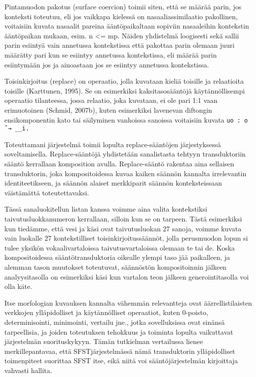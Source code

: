 \documentclass[free]{flammie}
\begin{document}
Pintamuodon pakotus (surface coercion) toimii siten, että se määrää parin, jos
konteksti toteutuu, eli jos vaikkapa kielessä on nasaaliassimilaatio pakollinen, voitaisiin kuvata nasaalit pareina ääntöpaikaltaan sopiviin nasaaleihin kontekstin ääntöpaikan mukaan, esim. n <= mp. Näiden yhdistelmä loogisesti sekä sallii parin
esiintyä vain annetussa kontekstissa että pakottaa parin olemaan juuri määrätty
pari kun se esiintyy annetussa kontekstissa, eli määrää parin esiintymään jos ja
ainoastaan jos se esiintyy annetussa kontekstissa.

Toisinkirjoitus (replace) on operaatio, jolla kuvataan kieliä toisille ja relaatioita
toisille (Karttunen, 1995). Se on esimerkiksi kaksitasosääntöjä käytännöllisempi
operaatio tilanteessa, jossa relaatio, joka kuvataan, ei ole pari 1:1 vaan erimuotoinen (Schmid, 2007b), kuten esimerkiksi lavenevan diftongin ensikomponentin
kato tai säilyminen vanhoissa sanoissa voitaisiin kuvata \verb|uo : o ˆ→ __i.|

Toteuttamani järjestelmä toimii lopulta replace-sääntöjen järjestyksessä soveltamisella. Replace-sääntöjä yhdistetään sanalistasta tehtyyn transduktoriin sääntö
kerrallaan komposition avulla. Replace-sääntö rakentaa aina sellaisen transduktorin, joka kompositoidessa kuvaa kaiken säännön kannalta irrelevantin identiteetikseen, ja säännön alaiset merkkiparit säännön konteksteissaan väistämättä toteutettavaksi.

Tässä sanaluokitellun listan kanssa voimme aina valita kontekstiksi taivutusluokkanumeron kerrallaan, silloin kun se on tarpeen. Tästä esimerkiksi kun tiedämme, että vesi ja käsi ovat taivutusluokan 27 sanoja, voimme kuvata vain luokalle
27 kontekstilliset toisinkirjoitussäännöt, jolla perusmuodon lopun si tulee yksikön vokaalivartaloissa taivutusvartaloissa olemaan te tai de. Koska kompositoidessa sääntötransduktoria oikealle ylempi taso jää paikalleen, ja alemman tason
muutokset toteutuvat, säännöstön kompositoinnin jälkeen analyysitasolla on esimerkiksi käsi kun vartalon teon jälkeen generointitasolla voi olla käte.

Itse morfologian kuvauksen kannalta vähemmän relevantteja ovat
äärrellistilaisten verkkojen ylläpidolliset ja käytännölliset operaatiot, kuten
0-poisto, determinisointi, minimointi, vertailu jne., jotka sovelluksissa ovat sinänsä tarpeellisia,
ja joiden toteutuksen tehokkuus ja toiminta lopulta vaikuttavat järjestelmän suorituskykyyn. Tämän tutkielman vertailussa lienee merkillepantavaa, että SFSTjärjestelmässä nämä transduktorin ylläpidolliset toimenpiteet suorittaa SFST itse,
eikä niitä voi sääntöjärjestelmän kirjoittaja vahvasti hallita.
\end{document}
